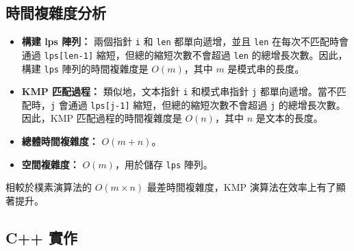 \subsection{時間複雜度分析}
\begin{itemize}
    \item \textbf{構建 lps 陣列：}
        兩個指針 \verb|i| 和 \verb|len| 都單向遞增，並且 \verb|len| 在每次不匹配時會通過 \verb|lps[len-1]| 縮短，但總的縮短次數不會超過 \verb|len| 的總增長次數。因此，構建 \verb|lps| 陣列的時間複雜度是 $O(m)$，其中 $m$ 是模式串的長度。
    \item \textbf{KMP 匹配過程：}
        類似地，文本指針 \verb|i| 和模式串指針 \verb|j| 都單向遞增。當不匹配時，\verb|j| 會通過 \verb|lps[j-1]| 縮短，但總的縮短次數不會超過 \verb|j| 的總增長次數。因此，KMP 匹配過程的時間複雜度是 $O(n)$，其中 $n$ 是文本的長度。
    \item \textbf{總體時間複雜度：} $O(m + n)$。
    \item \textbf{空間複雜度：} $O(m)$，用於儲存 \verb|lps| 陣列。
\end{itemize}
相較於樸素演算法的 $O(m \times n)$ 最差時間複雜度，KMP 演算法在效率上有了顯著提升。

\subsection{C++ 實作}

